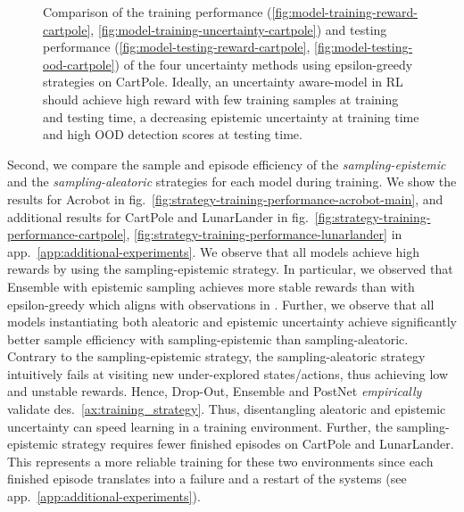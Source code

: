 \begin{figure}
\begin{subfigure}{.23\textwidth}
    \end{subfigure}
    \caption{Comparison of the training performance (\ref{fig:model-training-reward-cartpole},  \ref{fig:model-training-uncertainty-cartpole}) and testing performance (\ref{fig:model-testing-reward-cartpole},  \ref{fig:model-testing-ood-cartpole}) of the four uncertainty methods using epsilon-greedy strategies on CartPole. Ideally, an uncertainty aware-model in RL should achieve high reward with few training samples at training and testing time, a decreasing epistemic uncertainty at training time and high OOD detection scores at testing time.}
    \label{fig:model-training-testing-performance-cartpole-main}
\end{figure}

Second, we compare the sample and episode efficiency of the \emph{sampling-epistemic} and the \emph{sampling-aleatoric} strategies for each model during training. We show the results for Acrobot in fig.~\ref{fig:strategy-training-performance-acrobot-main}, and additional results for CartPole and LunarLander in fig.~\ref{fig:strategy-training-performance-cartpole}, \ref{fig:strategy-training-performance-lunarlander} in app.~\ref{app:additional-experiments}. We observe that all models achieve high rewards by using the sampling-epistemic strategy. In particular, we observed that Ensemble with epistemic sampling achieves more stable rewards than with epsilon-greedy which aligns with observations in \cite{bootstrapped-dqn}. Further, we observe that all models instantiating both aleatoric and epistemic uncertainty achieve significantly better sample efficiency with sampling-epistemic than sampling-aleatoric. Contrary to the sampling-epistemic strategy, the sampling-aleatoric strategy intuitively fails at visiting new under-explored states/actions, thus achieving low and unstable rewards. Hence, Drop-Out, Ensemble and PostNet \emph{empirically} validate des.~\ref{ax:training_strategy}. Thus, disentangling aleatoric and epistemic uncertainty can speed learning in a training environment. Further, the sampling-epistemic strategy requires fewer finished episodes on CartPole and LunarLander. This represents a more reliable training for these two environments since each finished episode translates into a failure and a restart of the systems (see app.~\ref{app:additional-experiments}).

%

% 
%

